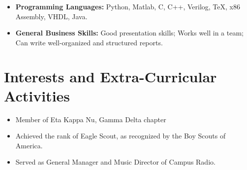 \documentclass[11pt,a4paper,sans]{moderncv}        %
\begin{document}
\vspace{3pt}

\begin{itemize}[label={}]

\item \textbf{Programming Languages: }Python, Matlab, C, C++, Verilog, TeX, x86 Assembly, VHDL, Java.
\vspace{3pt}

\item \textbf{General Business Skills:} Good presentation skills; Works well in a team; Can write well-organized and structured reports.

\end{itemize}

\section{Interests and Extra-Curricular Activities}


\begin{itemize}

\item{Member of Eta Kappa Nu, Gamma Delta chapter}
\item{Achieved the rank of Eagle Scout, as recognized by the Boy Scouts of America.}
\item{Served as General Manager and Music Director of Campus Radio.}

\end{itemize}

%


\end{document}
